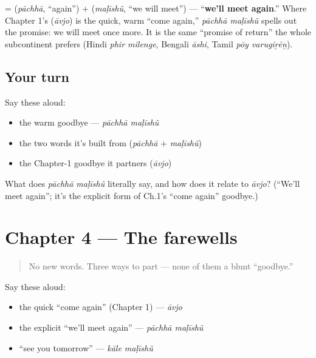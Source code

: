 \begin{cousinweb}
\textbf{ } = \textbf{} (\emph{pāchhā}, \textquotedblleft{}again\textquotedblright{}) + \textbf{} (\emph{maḷīshũ}, \textquotedblleft{}we will meet\textquotedblright{}) — \textquotedblleft{}\textbf{we'll meet again}.\textquotedblright{} Where Chapter 1's \textbf{} (\emph{āvjo}) is the quick, warm \textquotedblleft{}come again,\textquotedblright{} \emph{pāchhā maḷīshũ} spells out the promise: we will meet once more. It is the same \textquotedblleft{}promise of return\textquotedblright{} the whole subcontinent prefers (Hindi \emph{phir milenge}, Bengali \emph{āshi}, Tamil \emph{pōy varugiṟēṉ}).
\end{cousinweb}

\subsection*{Your turn}
Say these aloud:

\begin{itemize}
\raggedright
  \item the warm goodbye — \emph{pāchhā maḷīshũ}
  \item the two words it's built from (\emph{pāchhā} + \emph{maḷīshũ})
  \item the Chapter-1 goodbye it partners (\emph{āvjo})
\end{itemize}

\begin{tcolorbox}[breakable,colback=teal!4,colframe=teal!35!black,title={Before you move on}]
What does \emph{pāchhā maḷīshũ} literally say, and how does it relate to \emph{āvjo}? (\textquotedblleft{}We'll meet again\textquotedblright{}; it's the explicit form of Ch.1's \textquotedblleft{}come again\textquotedblright{} goodbye.)
\end{tcolorbox}
\section[Practice]{Chapter 4 — The farewells}

\label{lesson:GU-C04-practice}



\begin{quote}
No new words. Three ways to part — none of them a blunt \textquotedblleft{}goodbye.\textquotedblright{}
\end{quote}

\begin{culture}
Say these aloud:

\begin{itemize}
\raggedright
  \item the quick \textquotedblleft{}come again\textquotedblright{} (Chapter 1) — \emph{āvjo}
  \item the explicit \textquotedblleft{}we'll meet again\textquotedblright{} — \emph{pāchhā maḷīshũ}
  \item \textquotedblleft{}see you tomorrow\textquotedblright{} — \emph{kāle maḷīshũ}
\end{itemize}
\end{culture}

